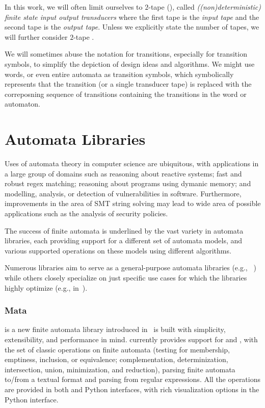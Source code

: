 
In this work, we will often limit ourselves to $2$-tape \nfts (\dfts), called \emph{((non)deterministic) finite state input output transducers} where the first tape is the \emph{input tape} and the second tape is the \emph{output tape}.
Unless we explicitly state the number of tapes, we will further consider $2$-tape \nfts.

We will sometimes abuse the notation for transitions, especially for transition symbols, to simplify the depiction of design ideas and algorithms.
We might use words, or even entire automata as transition symbols, which symbolically represents that the transition (or a single transducer tape) is replaced with the correposning sequence of transitions containing the transitions in the word or automaton.

\chapter{Automata Libraries}
\label{chap:finite_automata}

Uses of automata theory in computer science are ubiquitous, with applications in a large group of domains such as reasoning about reactive systems; fast and robust regex matching; reasoning about programs using dymanic memory; and modelling, analysis, or detection of vulnerabilities in software.
Furthermore, improvements in the area of SMT string solving may lead to wide area of possible applications such as the analysis of security policies.

The success of finite automata is underlined by the vast variety in automata libraries, each providing support for a different set of automata models, and various supported operations on these models using different algorithms.

Numerous libraries aim to serve as a general-purpose automata libraries (e.g., ~\cite{automatanet, tacas24_mata_10.1007/978-3-031-57249-4_7,fado}) while others closely specialize on just specific use cases for which the libraries highly optimize (e.g., in~\cite{mona,automatajar}).

\subsection{Mata}

\mata is a new finite automata library introduced in~\cite{tacas24_mata_10.1007/978-3-031-57249-4_7}
\mata is built with simplicity, extensibility, and performance in mind.
\mata currently provides support for \dfas and \nfas, with the set of classic operations on finite automata (testing for membership, emptiness, inclusion, or equivalence; complementation, determinization, intersection, union, minimization, and reduction),
parsing finite automata to/from a textual format and parsing \nfas from regular expressions.
All the operations are provided in both \cpp and Python interfaces, with rich visualization options in the Python interface.

